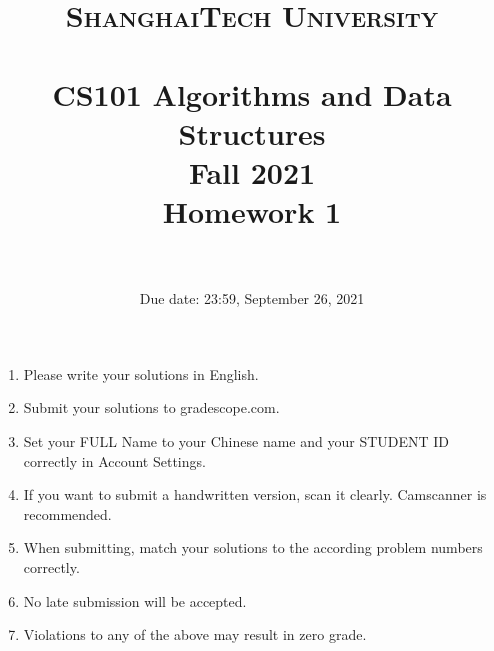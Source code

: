 \documentclass{article}
\title{
	\normalfont \normalsize
	\textsc{ShanghaiTech University} \\ [25pt]
	\horrule{0.5pt} \\[0.4cm] %
	\huge CS101 Algorithms and Data Structures\\ %
	\LARGE Fall 2021\\
	\LARGE Homework 1\\
	\horrule{2pt} \\[0.5cm] %
}
\author{}
\date{Due date: 23:59, September 26, 2021}
\begin{document}
\maketitle
\thispagestyle{firstpage}
\vspace{3ex}

\begin{enumerate}
	\item Please write your solutions in English.

	\item Submit your solutions to gradescope.com.

	\item Set your FULL Name to your Chinese name and your STUDENT ID correctly in Account Settings.

	\item If you want to submit a handwritten version, scan it clearly. Camscanner is recommended.

	\item When submitting, match your solutions to the according problem numbers correctly.

	\item No late submission will be accepted.

	\item Violations to any of the above may result in zero grade.
\end{enumerate}
\newpage
\end{document}
